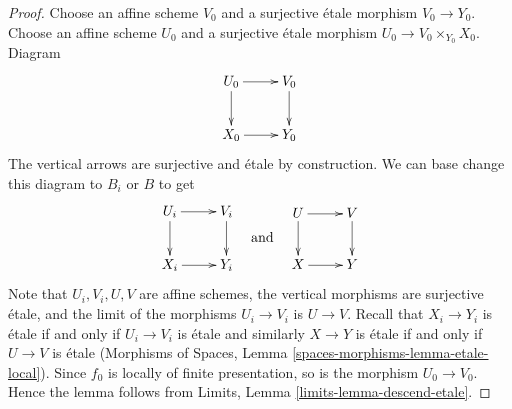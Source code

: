 \documentclass{stacks-project}
\theoremstyle{plain}
\theoremstyle{definition}
\theoremstyle{remark}
\numberwithin{equation}{subsection}
\begin{document}
\begin{proof}
Choose an affine scheme $V_0$ and a surjective \'etale morphism
$V_0 \to Y_0$. Choose an affine scheme $U_0$ and a surjective \'etale
morphism $U_0 \to V_0 \times_{Y_0} X_0$. Diagram
$$
\xymatrix{
U_0 \ar[d] \ar[r] & V_0 \ar[d] \\
X_0 \ar[r] & Y_0
}
$$
The vertical arrows are surjective and \'etale by construction.
We can base change this diagram to $B_i$ or $B$ to get
$$
\vcenter{
\xymatrix{
U_i \ar[d] \ar[r] & V_i \ar[d] \\
X_i \ar[r] & Y_i
}
}
\quad\text{and}\quad
\vcenter{
\xymatrix{
U \ar[d] \ar[r] & V \ar[d] \\
X \ar[r] & Y
}
}
$$
Note that $U_i, V_i, U, V$ are affine schemes,
the vertical morphisms are surjective \'etale, and the limit of the
morphisms $U_i \to V_i$ is $U \to V$. Recall that $X_i \to Y_i$ is \'etale
if and only if $U_i \to V_i$ is
\'etale and similarly $X \to Y$ is \'etale if and only if
$U \to V$ is \'etale
(Morphisms of Spaces, Lemma \ref{spaces-morphisms-lemma-etale-local}).
Since $f_0$ is locally of finite
presentation, so is the morphism $U_0 \to V_0$. Hence the lemma follows
from Limits, Lemma \ref{limits-lemma-descend-etale}.
\end{proof}
\end{document}
